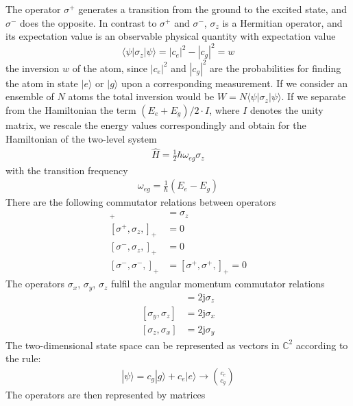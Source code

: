 \documentclass[book.tex]{subfiles}
\begin{document}
The operator $\sigma^+$ generates a transition from the ground to the excited state, and $\sigma^-$ does the opposite. In contrast to $\sigma^+$ and $\sigma^-$, $\sigma_z$ is a Hermitian operator, and its expectation value is an observable physical quantity with expectation value
\begin{equation}
    \langle\psi|\sigma_z|\psi\rangle = |c_e|^2-|c_g|^2=w
\end{equation}
the inversion $w$ of the atom, since $|c_e|^2$ and $|c_g|^2$ are the probabilities for
finding the atom in state $|e\rangle$ or $|g\rangle$ upon a corresponding measurement. If
we consider an ensemble of $N$ atoms the total inversion would be $W =
N \langle\psi|\sigma_z|\psi\rangle$. If we separate from the Hamiltonian the term $(E_e +
E_g)/2 ·I$, where $I$ denotes the unity matrix, we rescale the energy values
correspondingly and obtain for the Hamiltonian of the two-level system
\begin{align}
\hat{H}=\frac{1}{2}\hbar\omega_{eg}\sigma_z
\end{align}
with the transition frequency
\begin{align}
    \omega_{eg}=\frac{1}{\hbar}(E_e-E_g)
\end{align}
There are the following commutator relations between operators
\begin{align}
    [\sigma^+,\sigma^-,]_+ &=\sigma_z \\
    [\sigma^+,\sigma_z,]_+ &=0 \\
    [\sigma^-,\sigma_z,]_+ &=0 \\
    [\sigma^-,\sigma^-,]_+ &=[\sigma^+,\sigma^+,]_+=0
\end{align}
The operators $\sigma_x$, $\sigma_y$, $\sigma_z$ fulfil the angular momentum commutator relations
\begin{align}
    [\sigma_x,\sigma_y]&=\mathrm{2j}\sigma_z \\
    [\sigma_y,\sigma_z]&=\mathrm{2j}\sigma_x \\
    [\sigma_z,\sigma_x]&=\mathrm{2j}\sigma_y 
\end{align}
The two-dimensional state space can be represented as vectors in $\mathbb{C}^2$ according to the rule:
\begin{align}
    |\psi\rangle=c_g|g\rangle+c_e|e\rangle \longrightarrow {c_e \choose c_g} 
\end{align}
The operators are then represented by matrices
\end{document}
